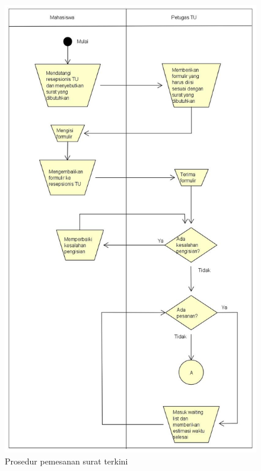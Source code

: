 \begin{figure}[H]
	\centering
		\includegraphics[scale=0.25]{Gambar/Diagram/sistem_terkini/work_flow/pemesanan_terkini.jpg}
	{\caption{Prosedur pemesanan surat terkini}}
	\label{fig:pemesanan_terkini}
\end{figure}

